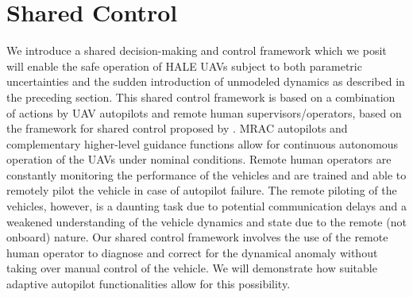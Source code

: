 \documentclass[english]{ifacconf}
\begin{document}


\section{Shared Control}\label{sec:shared_ctrl}
We introduce a shared decision-making and control framework which we posit will enable the safe operation of HALE UAVs subject to both parametric uncertainties and the sudden introduction of unmodeled dynamics as described in the preceding section. This shared control framework is based on a combination of actions by UAV autopilots and remote human supervisors/operators, based on the framework for shared control proposed by \cite{thomsen2018shared}. MRAC autopilots and complementary higher-level guidance functions allow for continuous autonomous operation of the UAVs under nominal conditions. Remote human operators are constantly monitoring the performance of the vehicles and are trained and able to remotely pilot the vehicle in case of autopilot failure. The remote piloting of the vehicles, however, is a daunting task due to potential communication delays and a weakened understanding of the vehicle dynamics and state due to the remote (not onboard) nature. Our shared control framework involves the use of the remote human operator to diagnose and correct for the dynamical anomaly without taking over manual control of the vehicle. We will demonstrate how suitable adaptive autopilot functionalities allow for this possibility.

\end{document}
